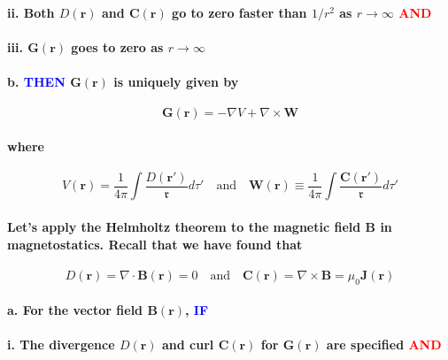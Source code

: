 \documentclass{article}
\begin{document}
\paragraph{\indent\indent ii. Both $D(\boldsymbol{r})$ and $\boldsymbol{C}(\boldsymbol{r})$ go to zero faster than $1/r^2$ as $r\rightarrow \infty$ \textcolor{red}{AND}}
\paragraph{\indent \indent iii. $\boldsymbol{G}(\boldsymbol{r})$ goes to zero as $r\longrightarrow \infty$}
\paragraph{\indent b. \textcolor{blue}{THEN} $\boldsymbol{G}(\boldsymbol{r})$ is uniquely given by}
\begin{equation*}
    \boldsymbol{G}(\boldsymbol{r})=-\nabla V+\nabla\times\boldsymbol{W}
\end{equation*}
\paragraph{where}
\begin{equation*}
    V(\boldsymbol{r})=\frac{1}{4\pi}\int\frac{D(\boldsymbol{r}')}{\mathfrak{r}}d\tau'\quad\text{and}\quad \boldsymbol{W}(\boldsymbol{r})\equiv\frac{1}{4\pi}\int \frac{\boldsymbol{C}(\boldsymbol{r}')}{\mathfrak{r}}d\tau'
\end{equation*}
\paragraph{Let's apply the Helmholtz theorem to the magnetic field $\boldsymbol{B}$ in magnetostatics. Recall that we have found that}
\begin{equation*}
    D(\boldsymbol{r})=\nabla\cdot\boldsymbol{B}(\boldsymbol{r})=0\quad\text{and}\quad \boldsymbol{C}(\boldsymbol{r})=\nabla\times\boldsymbol{B}=\mu_0\boldsymbol{J}(\boldsymbol{r})
\end{equation*}
\paragraph{\indent a. For the vector field $\boldsymbol{B}(\boldsymbol{r})$, \textcolor{blue}{IF}}
\paragraph{\indent\indent i. The divergence $D(\boldsymbol{r})$ and curl $\boldsymbol{C}(\boldsymbol{r})$ for $\boldsymbol{G}(\boldsymbol{r})$ are specified \textcolor{red}{AND}}
\end{document}
